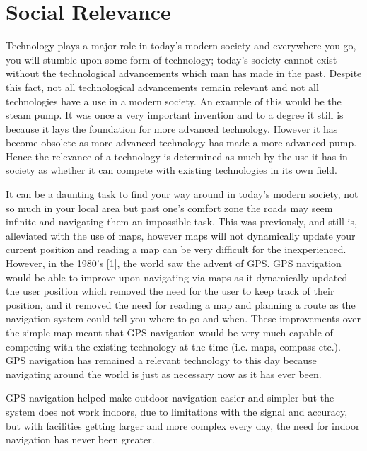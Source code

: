 \section{Social Relevance}


Technology plays a major role in today's modern society and everywhere you go, you will stumble upon some form of technology; today's society cannot exist without the technological advancements which man has made in the past. Despite this fact, not all technological advancements remain relevant and not all technologies have a use in a modern society. An example of this would be the steam pump. It was once a very important invention and to a degree it still is because it lays the foundation for more advanced technology. However it has become obsolete as more advanced technology has made a more advanced pump. Hence the relevance of a technology is determined as much by the use it has in society as whether it can compete with existing technologies in its own field.

It can be a daunting task to find your way around in today's modern society, not so much in your local area but past one's comfort zone the roads may seem infinite and navigating them an impossible task. This was previously, and still is, alleviated with the use of maps, however maps will not dynamically update your current position and reading a map can be very difficult for the inexperienced. However, in the 1980's [1], the world saw the advent of GPS. GPS navigation would be able to improve upon navigating via maps as it dynamically updated the user position which removed the need for the user to keep track of their position, and it removed the need for reading a map and planning a route as the navigation system could tell you where to go and when. These improvements over the simple map meant that GPS navigation would be very much capable of competing with the existing technology at the time (i.e. maps, compass etc.). GPS navigation has remained a relevant technology to this day because navigating around the world is just as necessary now as it has ever been.

GPS navigation helped make outdoor navigation easier and simpler but the system does not work indoors, due to limitations with the signal and accuracy, but with facilities getting larger and more complex every day, the need for indoor navigation has never been greater.

